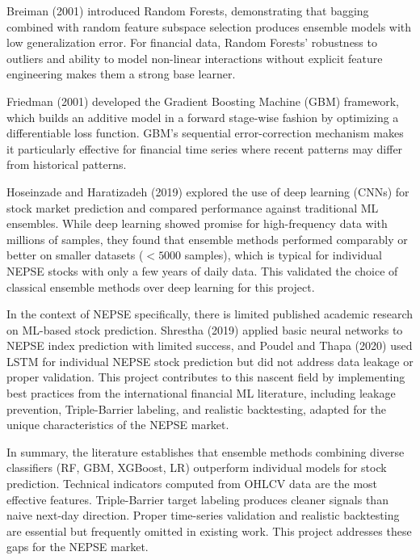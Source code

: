 \documentclass[12pt, a4paper]{report}
\begin{document}
	Breiman (2001) \cite{breiman2001} introduced Random Forests, demonstrating that bagging combined with random feature subspace selection produces ensemble models with low generalization error. For financial data, Random Forests' robustness to outliers and ability to model non-linear interactions without explicit feature engineering makes them a strong base learner.
	
	Friedman (2001) \cite{friedman2001} developed the Gradient Boosting Machine (GBM) framework, which builds an additive model in a forward stage-wise fashion by optimizing a differentiable loss function. GBM's sequential error-correction mechanism makes it particularly effective for financial time series where recent patterns may differ from historical patterns.
	
	Hoseinzade and Haratizadeh (2019) \cite{hoseinzade2019} explored the use of deep learning (CNNs) for stock market prediction and compared performance against traditional ML ensembles. While deep learning showed promise for high-frequency data with millions of samples, they found that ensemble methods performed comparably or better on smaller datasets ($< 5000$ samples), which is typical for individual NEPSE stocks with only a few years of daily data. This validated the choice of classical ensemble methods over deep learning for this project.
	
	In the context of NEPSE specifically, there is limited published academic research on ML-based stock prediction. Shrestha (2019) \cite{shrestha2019} applied basic neural networks to NEPSE index prediction with limited success, and Poudel and Thapa (2020) \cite{poudel2020} used LSTM for individual NEPSE stock prediction but did not address data leakage or proper validation. This project contributes to this nascent field by implementing best practices from the international financial ML literature, including leakage prevention, Triple-Barrier labeling, and realistic backtesting, adapted for the unique characteristics of the NEPSE market.
	
	In summary, the literature establishes that ensemble methods combining diverse classifiers (RF, GBM, XGBoost, LR) outperform individual models for stock prediction. Technical indicators computed from OHLCV data are the most effective features. Triple-Barrier target labeling produces cleaner signals than naive next-day direction. Proper time-series validation and realistic backtesting are essential but frequently omitted in existing work. This project addresses these gaps for the NEPSE market.
	
\end{document}
